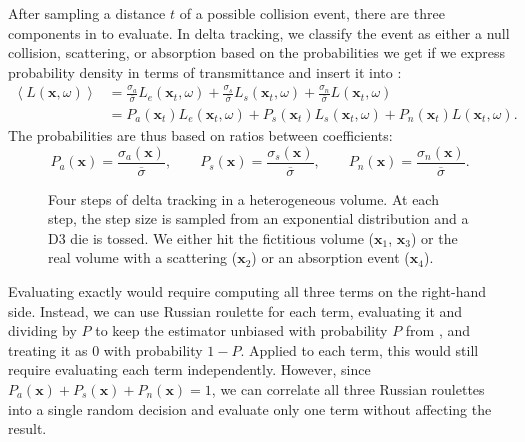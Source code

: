 After sampling a distance $t$ of a possible collision event, there are three
components in  to evaluate. In delta tracking, we classify
the event as either a null collision, scattering, or absorption based on the
probabilities we get if we express probability density in terms of transmittance
and insert it into :
\begin{align}
    \label{eq:delta}
    \left\langle L(\mathbf{x}, \omega) \right\rangle &=
        \frac{\sigma_a}{\overline\sigma} L_e(\mathbf{x}_t, \omega)  
        + \frac{\sigma_s}{\overline\sigma} L_s(\mathbf{x}_t, \omega)
        + \frac{\sigma_n}{\overline\sigma} L(\mathbf{x}_t, \omega) \\
    &= P_a(\mathbf{x}_t) L_e(\mathbf{x}_t, \omega)  
        + P_s(\mathbf{x}_t) L_s(\mathbf{x}_t, \omega)
        + P_n(\mathbf{x}_t) L(\mathbf{x}_t, \omega).
\end{align}
The probabilities are thus based on ratios between coefficients:
\begin{equation}
    \label{eq:probs}
    P_a(\mathbf{x}) = \frac{\sigma_a(\mathbf{x})}{\overline\sigma}, \qquad
    P_s(\mathbf{x}) = \frac{\sigma_s(\mathbf{x})}{\overline\sigma}, \qquad
    P_n(\mathbf{x}) = \frac{\sigma_n(\mathbf{x})}{\overline\sigma}.
\end{equation}

\begin{figure}[t]
    \centering
    
    \caption{
        Four steps of delta tracking in a heterogeneous volume. At each step,
        the step size is sampled from an exponential distribution and a D3 die
        is tossed. We either hit the fictitious volume ($\mathbf{x}_1$,
        $\mathbf{x}_3$) or the real volume with a scattering ($\mathbf{x}_2$)
        or an absorption event ($\mathbf{x}_4$).
    }
    \label{fig:delta}
\end{figure}

Evaluating  exactly would require computing all three terms
on the right-hand side. Instead, we can use Russian roulette for each term,
evaluating it and dividing by $P$ to keep the estimator unbiased with
probability $P$ from , and treating it as $0$ with probability
$1 - P$. Applied to each term, this would still require evaluating each term
independently. However, since
$P_a(\mathbf{x}) + P_s(\mathbf{x}) + P_n(\mathbf{x}) = 1$, we can correlate
all three Russian roulettes into a single random decision and evaluate only
one term without affecting the result.

